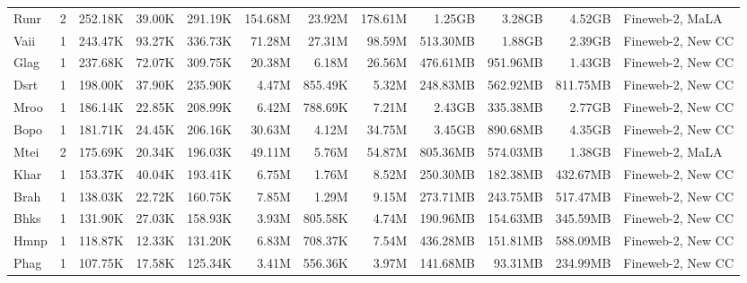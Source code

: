 \begin{table*}[!htp]
{\begin{tabular}{l|c|rrr|rrr|rrr|l}
Runr                    & 2                        & 252.18K  & 39.00K   & 291.19K & 154.68M & 23.92M  & 178.61M & 1.25GB   & 3.28GB   & 4.52GB   & Fineweb-2, MaLA                \\
Vaii                    & 1                        & 243.47K  & 93.27K   & 336.73K & 71.28M  & 27.31M  & 98.59M  & 513.30MB & 1.88GB   & 2.39GB   & Fineweb-2, New CC              \\
Glag                    & 1                        & 237.68K  & 72.07K   & 309.75K & 20.38M  & 6.18M   & 26.56M  & 476.61MB & 951.96MB & 1.43GB   & Fineweb-2, New CC              \\
Dsrt                    & 1                        & 198.00K  & 37.90K   & 235.90K & 4.47M   & 855.49K & 5.32M   & 248.83MB & 562.92MB & 811.75MB & Fineweb-2, New CC              \\
Mroo                    & 1                        & 186.14K  & 22.85K   & 208.99K & 6.42M   & 788.69K & 7.21M   & 2.43GB   & 335.38MB & 2.77GB   & Fineweb-2, New CC              \\
Bopo                    & 1                        & 181.71K  & 24.45K   & 206.16K & 30.63M  & 4.12M   & 34.75M  & 3.45GB   & 890.68MB & 4.35GB   & Fineweb-2, New CC              \\
Mtei                    & 2                        & 175.69K  & 20.34K   & 196.03K & 49.11M  & 5.76M   & 54.87M  & 805.36MB & 574.03MB & 1.38GB   & Fineweb-2, MaLA                \\
Khar                    & 1                        & 153.37K  & 40.04K   & 193.41K & 6.75M   & 1.76M   & 8.52M   & 250.30MB & 182.38MB & 432.67MB & Fineweb-2, New CC              \\
Brah                    & 1                        & 138.03K  & 22.72K   & 160.75K & 7.85M   & 1.29M   & 9.15M   & 273.71MB & 243.75MB & 517.47MB & Fineweb-2, New CC              \\
Bhks                    & 1                        & 131.90K  & 27.03K   & 158.93K & 3.93M   & 805.58K & 4.74M   & 190.96MB & 154.63MB & 345.59MB & Fineweb-2, New CC              \\
Hmnp                    & 1                        & 118.87K  & 12.33K   & 131.20K & 6.83M   & 708.37K & 7.54M   & 436.28MB & 151.81MB & 588.09MB & Fineweb-2, New CC              \\
Phag                    & 1                        & 107.75K  & 17.58K   & 125.34K & 3.41M   & 556.36K & 3.97M   & 141.68MB & 93.31MB  & 234.99MB & Fineweb-2, New CC              \\

\end{tabular}}
\end{table*}
